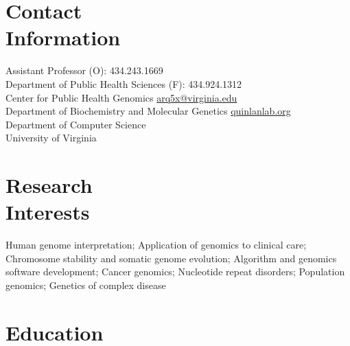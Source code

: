 \documentclass[margin,line]{cv}
\begin{document}
\begin{resume}
    \section{\mysidestyle Contact\\Information}
    Assistant Professor                                                                     \hfill (O): 434.243.1669\\%
    Department of Public Health Sciences                                                    \hfill (F): 434.924.1312\\%
    Center for Public Health Genomics                                                \hfill \url{arq5x@virginia.edu}\\%
    Department of Biochemistry and Molecular Genetics                                 \hfill    \url{quinlanlab.org}\\%
    Department of Computer Science                                                                            \hfill\\%
    University of Virginia                                                                                   \hfill \\%

    \section{\mysidestyle Research\\Interests}
	
    Human genome interpretation;
    Application of genomics to clinical care; 
    Chromosome stability and somatic genome evolution;
    Algorithm and genomics software development;
    Cancer genomics;
    Nucleotide repeat disorders; 
    Population genomics; 
    Genetics of complex disease 

    \section{\mysidestyle Education}


\end{resume}
\end{document}
